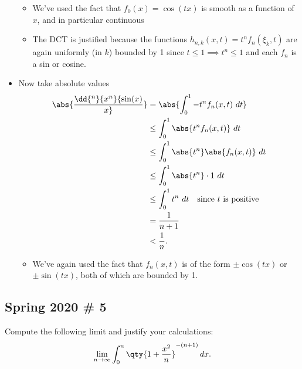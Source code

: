\begin{solution}
\begin{itemize}
  \begin{itemize}
  \tightlist
  \item
    We've used the fact that \(f_0(x) = \cos(tx)\) is smooth as a
    function of \(x\), and in particular continuous
  \item
    The DCT is justified because the functions
    \(h_{n, k}(x, t) = t^n f_n(\xi_k, t)\) are again uniformly (in
    \(k\)) bounded by 1 since \(t\leq 1 \implies t^n \leq 1\) and each
    \(f_n\) is a sin or cosine.
  \end{itemize}
\item
  Now take absolute values
  \begin{align*}
  \abs {\dd{^n}{x^n} {\sin(x) \over x}  }
  &= \abs{ \int_0^1 -t^n f_n(x, t) ~dt } \\ 
  &\leq \int_0^1 \abs{t^n f_n(x, t)} ~dt \\
  &\leq \int_0^1 \abs{t^n} \abs{f_n(x, t)} ~dt \\
  &\leq \int_0^1 \abs{ t^n} \cdot 1 ~dt \\ 
  &\leq \int_0^1 t^n ~dt \quad\text{since $t$ is positive} \\ 
  &= \frac{1}{n+1} \\
  &< \frac{1}{n}
  .\end{align*}

  \begin{itemize}
  \tightlist
  \item
    We've again used the fact that \(f_n(x, t)\) is of the form
    \(\pm \cos(tx)\) or \(\pm \sin(tx)\), both of which are bounded by
    1.
  \end{itemize}
\end{itemize}

\end{solution}

\hypertarget{spring-2020-5}{%
\subsection{Spring 2020 \# 5}\label{spring-2020-5}}

Compute the following limit and justify your calculations:
\begin{align*}
\lim_{n\to\infty} \int_0^n \qty{1 + {x^2 \over n}}^{-(n+1)} \,dx
.\end{align*}



